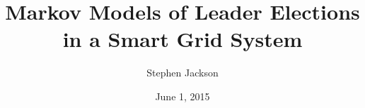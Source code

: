 \documentclass[12pt,oneside]{article}
\begin{document}
\title{Markov Models of Leader Elections in a Smart Grid System}
\author{Stephen Jackson}
\date{June 1, 2015}
\maketitle













\end{document}
